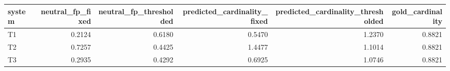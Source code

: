 \begin{tabular}{lrrrrr}
\toprule
system & neutral_fp_fixed & neutral_fp_thresholded & predicted_cardinality_fixed & predicted_cardinality_thresholded & gold_cardinality \\
\midrule
T1 & 0.2124 & 0.6180 & 0.5470 & 1.2370 & 0.8821 \\
T2 & 0.7257 & 0.4425 & 1.4477 & 1.1014 & 0.8821 \\
T3 & 0.2935 & 0.4292 & 0.6925 & 1.0746 & 0.8821 \\
\bottomrule
\end{tabular}

